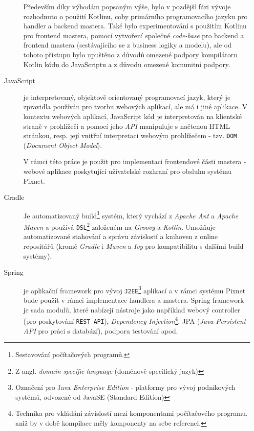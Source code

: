 \begin{description}
    Především díky výhodám popsaným výše, bylo v pozdější fázi vývoje rozhodnuto o použití Kotlinu, coby primárního programovacího jazyku pro handler a backend mastera. Také bylo experimentování s použitím Kotlinu pro frontend mastera, pomocí vytvoření společné \textit{code-base} pro backend a frontend mastera (sestávajícího se z business logiky a modelu), ale od tohoto přístupu bylo upuštěno z důvodů omezené podpory kompilátoru Kotlin kódu do JavaScriptu a z důvodu omezené komunitní podpory.
    
    \item[JavaScript] je interpretovaný, objektově orientovaný programovací jazyk, který je zpravidla používán pro tvorbu webových aplikací, ale má i jiné aplikace. V kontextu webových aplikací, JavaScript kód je interpretován na klientské straně v prohlížeči a pomocí jeho \textit{API} manipuluje s načtenou HTML stránkou, resp. její vnitřní interpretací webovým prohlížečem - tzv. \texttt{DOM} (\textit{Document Object Model}).
    
    V rámci této práce je použit pro implementaci frontendové části mastera - webové aplikace poskytující uživatelské rozhraní pro obsluhu systému Pixnet.
     
    \item[Gradle] Je automatizovaný build\footnote{Sestavování počítačových programů.} systém, který vychází z \textit{Apache Ant} a \textit{Apache Maven} a používá \texttt{DSL}\footnote{Z angl. \textit{domain-specific language} (doménově specifický jazyk)} založeném na \textit{Groovy} a \textit{Kotlin}. Umožňuje automatizované stahování a správu závislostí a knihoven z online repositářů (kromě \textit{Gradle} i \textit{Maven} a \textit{Ivy} pro kompatibilitu s dalšími build systémy).
    
    \item[Spring]\label{chap:arch:technologie:spring} je aplikační framework pro vývoj \texttt{J2EE}\footnote{Označení pro Java \textit{Enterprise Edition} - platformy pro vývoj podnikových systémů, odvozené od JavaSE (Standard Edition)} aplikací a v rámci systému Pixnet bude použit v rámci implementace handlera a mastera. Spring framework je sada modulů, které nabízejí nástroje jako například webový controller (pro poskytování \texttt{REST API}), \textit{Dependency Injection}\footnote{Technika pro vkládání závislostí mezi komponentami počítačového programu, aniž by v době kompilace měly komponenty na sebe referenci.}, JPA (\textit{Java Persistent API} pro práci s databází), podporu testování apod.


\end{description}

